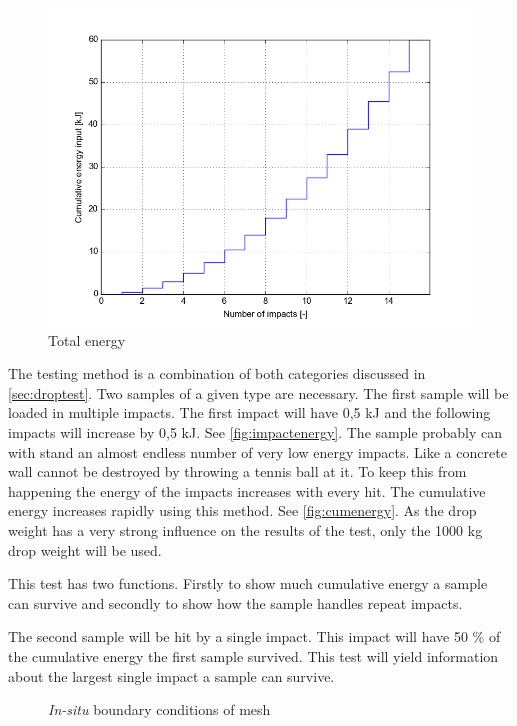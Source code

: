 \begin{figure}
    \centering
    \includegraphics[width = 0.95\linewidth]{pics/cum_energy.png}
    \caption{Total energy}
    \label{fig:cumenergy}
\end{figure}

The testing method is a combination of both categories discussed in \autoref{sec:droptest}. Two samples of a given type are necessary. The first sample will be loaded in multiple impacts. The first impact will have 0,5 kJ and the following impacts will increase by 0,5 kJ.  See \autoref{fig:impactenergy}. The sample probably can with stand an almost endless number of very low energy impacts. Like a concrete wall cannot be destroyed by throwing a tennis ball at it. To keep this from happening the energy of the impacts increases with every hit.
The cumulative energy increases rapidly using this method. See \autoref{fig:cumenergy}.
As the drop weight has a very strong influence on the results of the test, only the 1000 kg drop weight will be used.

This test has two functions. Firstly to show much cumulative energy a sample can survive and secondly to show how the sample handles repeat impacts.

The second sample will be hit by a single impact. This impact will have 50 \% of the cumulative energy the first sample survived. This test will yield information about the largest single impact a sample can survive.

\begin{figure}
    \centering
    
    \caption{\textit{In-situ} boundary conditions of mesh}
    \label{fig:insituMesh}
\end{figure}

